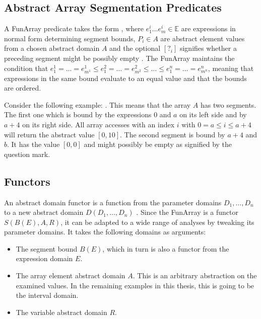 \subsection{Abstract Array Segmentation Predicates}



A FunArray predicate takes the form , where $e^i_1\ldots e^i_m\in\mathbb{E}$ are expressions in normal form determining segment bounds, $P_i\in A$ are abstract element values from a chosen abstract domain $A$ and the optional $[?_i]$ signifies whether a preceding segment might be possibly empty \cite{cousot2011}. The FunArray maintains the condition that $e_1^1=\ldots=e_{m^1}^1\leq e_1^2=\ldots=e_{m^2}^2\leq\ldots\leq e_1^n=\ldots=e_{m^n}^n$, meaning that expressions in the same bound evaluate to an equal value and that the bounds are ordered. 


Consider the following example: . This means that the array $A$ has two segments. The first one which is bound by the expressions $0$ and $a$ on its left side and by $a+4$ on its right side. All array accesses with an index $i$ with $0=a\leq i \leq a+ 4$ will return the abstract value $[0,10]$. The second segment is bound by $a+4$ and $b$. It has the value $[0,0]$ and might possibly be empty as signified by the question mark.


\subsection{Functors}

An abstract domain functor is a function from the parameter domains $D_1,\ldots,D_n$ to a new abstract domain $D(D_1,\ldots,D_n)$ \cite{cousot2011}.
Since the FunArray is a functor $S(B(E),A,R)$, it can be adapted to a wide range of analyses by tweaking its parameter domains. It takes the following domains as arguments:
\begin{itemize}[label={--}]
	\item The segment bound $B(E)$, which in turn is also a functor from the expression domain $E$.
	\item The array element abstract domain $A$. This is an arbitrary abstraction on the examined values. In the remaining examples in this thesis, this is going to be the interval domain.
	\item The variable abstract domain $R$.
\end{itemize} 


